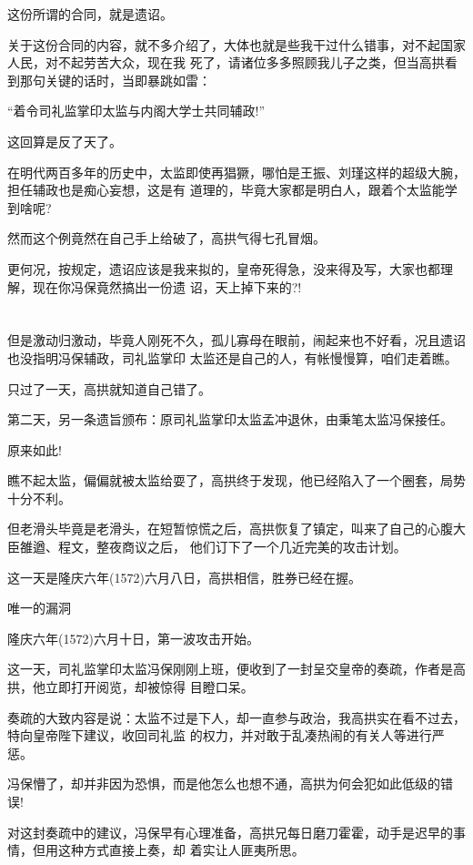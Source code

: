 \documentclass[11pt,a4paper,onecolumn]{article}
\begin{document}
这份所谓的合同，就是遗诏。

关于这份合同的内容，就不多介绍了，大体也就是些我干过什么错事，对不起国家人民，对不起劳苦大众，现在我
死了，请诸位多多照顾我儿子之类，但当高拱看到那句关键的话时，当即暴跳如雷：

``着令司礼监掌印太监与内阁大学士共同辅政!''

这回算是反了天了。

在明代两百多年的历史中，太监即使再猖獗，哪怕是王振、刘瑾这样的超级大腕，担任辅政也是痴心妄想，这是有
道理的，毕竟大家都是明白人，跟着个太监能学到啥呢?

然而这个例竟然在自己手上给破了，高拱气得七孔冒烟。

更何况，按规定，遗诏应该是我来拟的，皇帝死得急，没来得及写，大家也都理解，现在你冯保竟然搞出一份遗
诏，天上掉下来的?!

\section[\thesection]{}

但是激动归激动，毕竟人刚死不久，孤儿寡母在眼前，闹起来也不好看，况且遗诏也没指明冯保辅政，司礼监掌印
太监还是自己的人，有帐慢慢算，咱们走着瞧。

只过了一天，高拱就知道自己错了。

第二天，另一条遗旨颁布：原司礼监掌印太监孟冲退休，由秉笔太监冯保接任。

原来如此!

瞧不起太监，偏偏就被太监给耍了，高拱终于发现，他已经陷入了一个圈套，局势十分不利。

但老滑头毕竟是老滑头，在短暂惊慌之后，高拱恢复了镇定，叫来了自己的心腹大臣雒遒、程文，整夜商议之后，
他们订下了一个几近完美的攻击计划。

这一天是隆庆六年(1572)六月八日，高拱相信，胜券已经在握。

唯一的漏洞

隆庆六年(1572)六月十日，第一波攻击开始。

这一天，司礼监掌印太监冯保刚刚上班，便收到了一封呈交皇帝的奏疏，作者是高拱，他立即打开阅览，却被惊得
目瞪口呆。

奏疏的大致内容是说：太监不过是下人，却一直参与政治，我高拱实在看不过去，特向皇帝陛下建议，收回司礼监
的权力，并对敢于乱凑热闹的有关人等进行严惩。

冯保懵了，却并非因为恐惧，而是他怎么也想不通，高拱为何会犯如此低级的错误!

对这封奏疏中的建议，冯保早有心理准备，高拱兄每日磨刀霍霍，动手是迟早的事情，但用这种方式直接上奏，却
着实让人匪夷所思。
\end{document}
